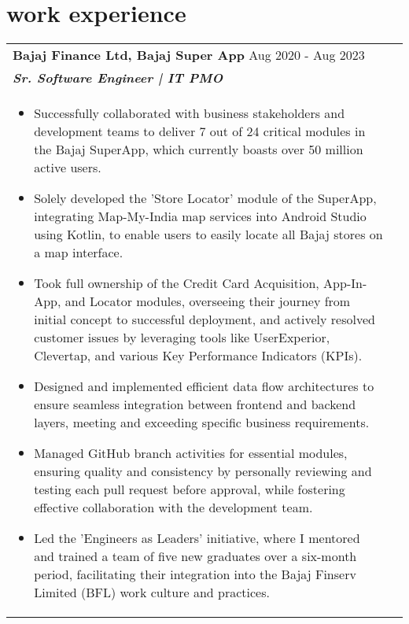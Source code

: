 \documentclass[a4paper,8pt]{article}
\begin{document}
\section{work experience}
\begin{tabularx}{\linewidth}{ @{}l r@{} }
\textbf{{Bajaj Finance Ltd, Bajaj Super App}} \hfill \color[HTML]{371e77} Aug 2020 - Aug 2023 \\[4pt]
\color[HTML]{371e77}\textbf{\textit{Sr. Software Engineer | IT PMO}} \color[HTML]{4B28A4} \\[5pt]
\begin{minipage}[t]{\linewidth}
    \begin{itemize}[nosep,after=\strut, leftmargin=2em, itemsep=2pt]
        \item Successfully collaborated with business stakeholders and development teams to deliver 7 out of 24 critical modules in the Bajaj SuperApp, which currently boasts over 50 million active users.
        \item Solely developed the 'Store Locator' module of the SuperApp, integrating Map-My-India map services into Android Studio using Kotlin, to enable users to easily locate all Bajaj stores on a map interface.
        \item Took full ownership of the Credit Card Acquisition, App-In-App, and Locator modules, overseeing their journey from initial concept to successful deployment, and actively resolved customer issues by leveraging tools like UserExperior, Clevertap, and various Key Performance Indicators (KPIs).
        \item Designed and implemented efficient data flow architectures to ensure seamless integration between frontend and backend layers, meeting and exceeding specific business requirements.
        \item Managed GitHub branch activities for essential modules, ensuring quality and consistency by personally reviewing and testing each pull request before approval, while fostering effective collaboration with the development team.
        \item Led the 'Engineers as Leaders' initiative, where I mentored and trained a team of five new graduates over a six-month period, facilitating their integration into the Bajaj Finserv Limited (BFL) work culture and practices.
    \end{itemize}
\end{minipage}
\end{tabularx}

\vspace{4 pt}
\end{document}
